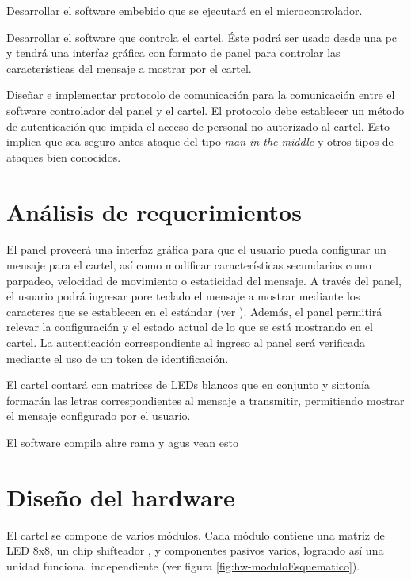 Desarrollar el software embebido que se ejecutará en el microcontrolador.

Desarrollar el software que controla el cartel. Éste podrá ser usado desde una pc y tendrá una interfaz gráfica con formato de panel para controlar las características del mensaje a mostrar por el cartel.

Diseñar e implementar protocolo de comunicación para la comunicación entre el software controlador del panel y el cartel. El protocolo debe establecer un método de autenticación que impida el acceso de personal no autorizado al cartel. Esto implica que sea seguro antes ataque del tipo \emph{man-in-the-middle} y otros tipos de ataques bien conocidos.

\section{Análisis de requerimientos}



El panel proveerá una interfaz gráfica para que el usuario pueda configurar un mensaje para el cartel, así como modificar características secundarias como parpadeo, velocidad de movimiento o estaticidad del mensaje. A través del panel, el usuario podrá ingresar pore teclado el mensaje a mostrar mediante los caracteres que se establecen en el estándar (ver \cite{CodifChar}). Además, el panel permitirá relevar la configuración y el estado actual de lo que se está mostrando en el cartel. La autenticación correspondiente al ingreso al panel será verificada mediante el uso de un token de identificación.

El cartel contará con matrices de LEDs blancos que en conjunto y sintonía formarán las letras correspondientes al mensaje a transmitir, permitiendo mostrar el mensaje configurado por el usuario. 

El software compila ahre rama y agus vean esto


\section{Diseño del hardware}
El cartel se compone de varios módulos. Cada módulo contiene una matriz de LED 8x8, un chip shifteador \cite{MAX7219}, y componentes pasivos varios, logrando así una unidad funcional independiente (ver figura \ref{fig:hw-moduloEsquematico}). 


